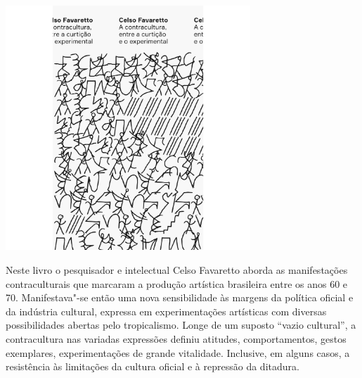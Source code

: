 \hspace*{-.4cm}\begin{minipage}[c]{.5\linewidth}
\small{
{}}
\end{minipage}

\pagebreak

\hspace{.5cm}

\begin{center}
\hspace*{-2.5cm}
\hspace*{2.5cm}\includegraphics[width=92mm]{./grid/favaretto.png}
\end{center}

\hspace*{-7cm}\hrulefill\hspace*{-7cm}

\medskip

\noindent{}Neste livro o pesquisador e intelectual Celso Favaretto aborda as manifestações contraculturais que marcaram a produção artística brasileira entre os anos 60 e 70. Manifestava"-se então uma nova sensibilidade às margens da política oficial e da indústria cultural, expressa em experimentações artísticas com diversas possibilidades abertas pelo tropicalismo. Longe de um suposto “vazio cultural”, a contracultura nas variadas expressões definiu atitudes, comportamentos, gestos exemplares, experimentações de grande vitalidade. Inclusive, em alguns casos, a resistência às limitações da cultura oficial e à repressão da ditadura.


